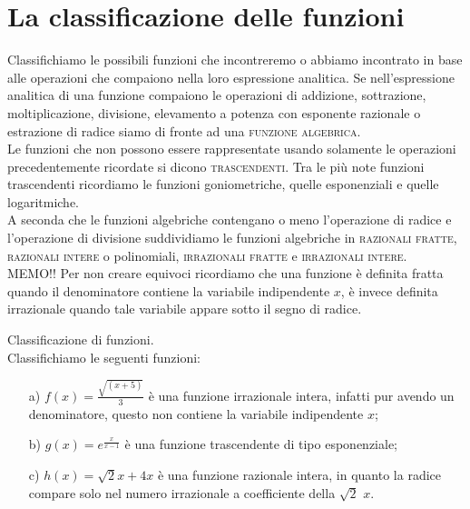 \section{La classificazione delle funzioni}
Classifichiamo le possibili funzioni che incontreremo o abbiamo incontrato in 
base alle operazioni che compaiono nella loro espressione analitica. Se 
nell'espressione analitica di una funzione compaiono le operazioni di 
addizione, sottrazione, moltiplicazione, divisione, elevamento a potenza con 
esponente razionale o estrazione di radice siamo di fronte ad una 
\textsc{funzione algebrica}.\\

Le funzioni che non possono essere rappresentate usando solamente le 
operazioni precedentemente ricordate si dicono \textsc{trascendenti}. Tra le 
più note funzioni trascendenti ricordiamo le funzioni goniometriche, quelle 
esponenziali e quelle logaritmiche.\\

A seconda che le funzioni algebriche contengano o meno l'operazione di radice 
e l'operazione di divisione suddividiamo le funzioni algebriche in 
\textsc{razionali fratte}, \textsc{razionali intere} o polinomiali, 
\textsc{irrazionali fratte} e \textsc{irrazionali intere}. \\

\textsf{MEMO!!} Per non creare equivoci ricordiamo che una funzione è 
definita fratta quando il denominatore contiene la variabile indipendente 
$x$, è invece definita irrazionale quando tale variabile appare sotto il 
segno di radice.\\



\begin{esempio} Classificazione di funzioni.\\
Classifichiamo le seguenti funzioni: 
  \begin{itemize}
  \item[a)] $f(x)=\frac{\sqrt{(x+5)}}{3}$ è una funzione 
irrazionale intera, infatti pur avendo un denominatore, questo non contiene 
la variabile indipendente $x$;
  
  \item[b)] $g(x)=e^{\frac{x}{x-1}}$ è una funzione 
trascendente di tipo esponenziale;

  \item[c)] $h(x)=\sqrt{2}x+4x$ è una funzione razionale 
intera, in quanto la radice compare solo nel numero irrazionale  a 
coefficiente della $\sqrt{2}$ $x$.
  \end{itemize}
\end{esempio}

